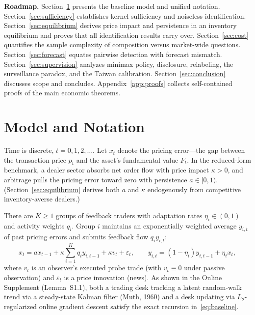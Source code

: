 \documentclass[11pt,letterpaper]{article}
\theoremstyle{definition}
\begin{document}
\textbf{Roadmap.} Section~\ref{sec:model} presents the baseline model and unified notation. Section~\ref{sec:sufficiency} establishes kernel sufficiency and noiseless identification. Section~\ref{sec:equilibrium} derives price impact and persistence in an inventory equilibrium and proves that all identification results carry over. Section~\ref{sec:cost} quantifies the sample complexity of composition versus market-wide questions. Section~\ref{sec:forecast} equates pairwise detection with forecast mismatch. Section~\ref{sec:supervision} analyzes minimax policy, disclosure, relabeling, the surveillance paradox, and the Taiwan calibration. Section~\ref{sec:conclusion} discusses scope and concludes. Appendix~\ref{app:proofs} collects self-contained proofs of the main economic theorems.

\section{Model and Notation}\label{sec:model}

Time is discrete, $t = 0, 1, 2, \dots$. Let $x_t$ denote the pricing error—the gap between the transaction price $p_t$ and the asset's fundamental value $F_t$. In the reduced-form benchmark, a dealer sector absorbs net order flow with price impact $\kappa > 0$, and arbitrage pulls the pricing error toward zero with persistence $a \in [0, 1)$. (Section~\ref{sec:equilibrium} derives both $a$ and $\kappa$ endogenously from competitive inventory-averse dealers.)

There are $K \ge 1$ groups of feedback traders with adaptation rates $\eta_i \in (0, 1)$ and activity weights $q_i$. Group $i$ maintains an exponentially weighted average $y_{i,t}$ of past pricing errors and submits feedback flow $q_i y_{i,t}$:
\begin{equation}\label{eq:baseline}
  x_t = a x_{t-1} + \kappa \sum_{i=1}^K q_i y_{i,t-1} + \kappa v_t + \varepsilon_t,
  \qquad
  y_{i,t} = (1 - \eta_i) y_{i,t-1} + \eta_i x_t,
\end{equation}
where $v_t$ is an observer's executed probe trade (with $v_t \equiv 0$ under passive observation) and $\varepsilon_t$ is a price innovation (news). As shown in the Online Supplement (Lemma~S1.1), both a trading desk tracking a latent random-walk trend via a steady-state Kalman filter (Muth, 1960) and a desk updating via $L_2$-regularized online gradient descent satisfy the exact recursion in~\eqref{eq:baseline}.
\end{document}
